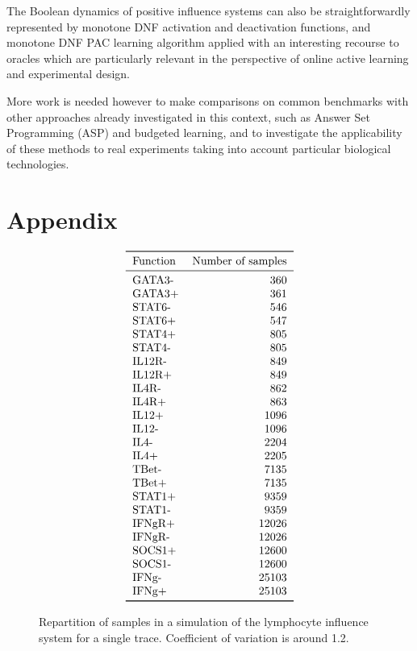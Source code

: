 \documentclass{llncs}
\begin{document}
The Boolean dynamics of positive influence systems can also be straightforwardly represented by monotone DNF activation and deactivation functions,
and monotone DNF PAC learning algorithm applied with an interesting recourse to oracles 
which are particularly relevant in the perspective of online active learning and experimental design.

More work is needed however to make comparisons on common benchmarks
with  other approaches already investigated in this context, such as Answer Set Programming (ASP) and budgeted learning,
and to investigate the applicability of these methods to real experiments taking into account particular biological technologies.



\newpage
\section*{Appendix}
\begin{listfig}[H]

\caption{Code for the lymphocyte differentiation of example~\ref{ex:lympho}.\label{bool-lympho}}
\end{listfig}


\begin{figure}[htbp]
	\[
	\begin{tabular}{l r}
		\toprule	     
		Function &  Number of samples\\
		\midrule
		GATA3-   &    360 \\
		GATA3+   &    361 \\
		STAT6-   &    546 \\
		STAT6+   &    547 \\
		STAT4+   &    805 \\
		STAT4-   &    805 \\
		IL12R-   &    849 \\
		IL12R+   &    849 \\
		IL4R-    &    862 \\
		IL4R+    &    863 \\
		IL12+    &   1096 \\
		IL12-    &   1096 \\
		IL4-     &   2204 \\
		IL4+     &   2205 \\
		TBet-    &   7135 \\
		TBet+    &   7135 \\
		STAT1+   &   9359 \\
		STAT1-   &   9359 \\
		IFNgR+   &  12026 \\
		IFNgR-   &  12026 \\
		SOCS1+   &  12600 \\
		SOCS1-   &  12600 \\
		IFNg-    &  25103 \\
		IFNg+    &  25103 \\
		\bottomrule
	\end{tabular}
	\]
	\caption{Repartition of samples in a simulation of the lymphocyte influence system for a single trace. Coefficient of variation is around 1.2.\label{nsample-tab}}
\end{figure}
\end{document}
